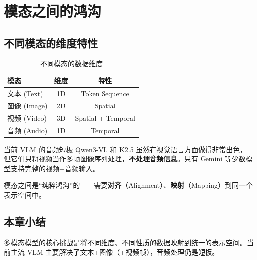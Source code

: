 \section{模态之间的鸿沟}

\subsection{不同模态的维度特性}

\begin{table}[H]
\centering
\caption{不同模态的数据维度}
\begin{tabular}{lcc}
\toprule
\textbf{模态} & \textbf{维度} & \textbf{特性} \\
\midrule
文本 (Text) & 1D & Token Sequence \\
图像 (Image) & 2D & Spatial \\
视频 (Video) & 3D & Spatial + Temporal \\
音频 (Audio) & 1D & Temporal \\
\bottomrule
\end{tabular}
\end{table}

\begin{warningbox}{当前 VLM 的音频短板}
Qwen3-VL 和 K2.5 虽然在视觉语言方面做得非常出色，但它们只将视频当作多帧图像序列处理，\textbf{不处理音频信息}。只有 Gemini 等少数模型支持完整的视频+音频输入。
\end{warningbox}

模态之间是``纯粹鸿沟''的——需要\textbf{对齐}（Alignment）、\textbf{映射}（Mapping）到同一个表示空间中。

\subsection{本章小结}

多模态模型的核心挑战是将不同维度、不同性质的数据映射到统一的表示空间。当前主流 VLM 主要解决了文本+图像（+视频帧），音频处理仍是短板。

